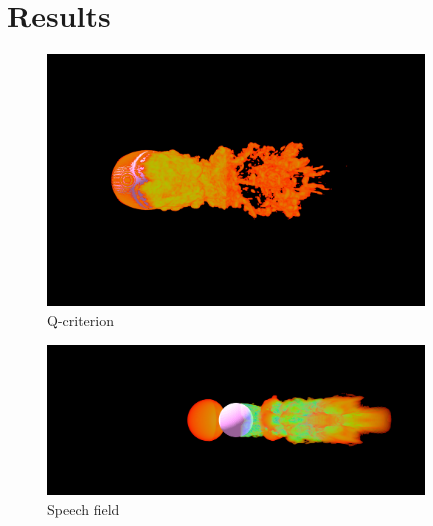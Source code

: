 \documentclass[acmtog]{acmart}
\begin{document}
	\section{Results}
	\begin{figure}[h]\centering 
		\centering
		\includegraphics[height=6.67cm,width=10cm]{result-bspline-trans10.png}\\
		Q-criterion
	\end{figure}
	\begin{figure}[hp]\centering 
		\centering
		\includegraphics[height=4cm,width=10cm]{result-velomodel-trans20.png}
		Speech field
	\end{figure}
	
	
	
\end{document}
